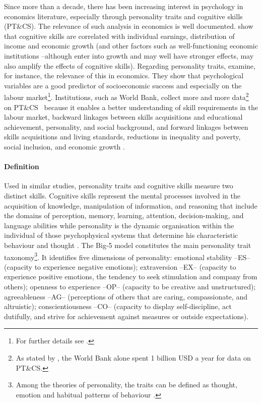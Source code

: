 \documentclass[a4paper, 12pt, onecolumn]{article}
\newcommand{\PTCS}{PT\&CS}
\begin{document}
Since more than a decade, there has been increasing interest in psychology in economics literature, especially through personality traits and cognitive skills (\PTCS).
The relevance of such analysis in economics is well documented.
\cite{Hanushek2008} show that cognitive skills are correlated with individual earnings, distribution of income and economic growth (and other factors such as well-functioning economic institutions --although enter into growth and may well have stronger effects, may also amplify the effects of cognitive skills).
Regarding personality traits, \cite{Borghans2008} examine, for instance, the relevance of this in economics.
They show that psychological variables are a good predictor of socioeconomic success and especially on the labour market\footnote{For further details see \cite{Almlund2011}.}. %
Institutions, such as World Bank, collect more and more data\footnote{As stated by \cite{Laajaj2019b}, the World Bank alone spent 1 billion USD a year for data on \PTCS.} on \PTCS~ because it enables a better understanding of skill requirements in the labour market, backward linkages between skills acquisitions and educational achievement, personality, and social background, and forward linkages between skills acquisitions and living standards, reductions in inequality and poverty, social inclusion, and economic growth \citep{STEP2014}.



\paragraph{Definition}
Used in similar studies, personality traits and cognitive skills measure two distinct skills.
Cognitive skills represent the mental processes involved in the acquisition of knowledge, manipulation of information, and reasoning that include the domains of perception, memory, learning, attention, decision-making, and language abilities \citep{Kiely2014} while personality is the dynamic organisation within the individual of those psychophysical systems that determine his characteristic behaviour and thought \citep{Allport1961}.
The Big-5 model constitutes the main personality trait taxonomy\footnote{Among the theories of personality, the traits can be defined as thought, emotion and habitual patterns of behaviour \citep{Kassin2003}.}.
It identifies five dimensions of personality: emotional stability --ES-- (capacity to experience negative emotions); extraversion --EX-- (capacity to experience positive emotions, the tendency to seek stimulation and company from others); openness to experience --OP-- (capacity to be creative and unstructured); agreeableness --AG-- (perceptions of others that are caring, compassionate, and altruistic); conscientiousness --CO-- (capacity to display self-discipline, act dutifully, and strive for achievement against measures or outside expectations).	
\end{document}
